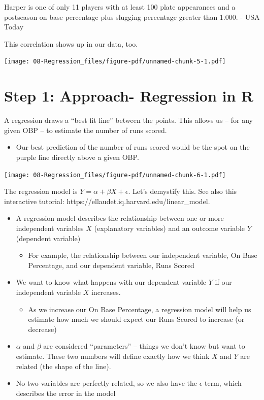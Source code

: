 \documentclass[
  letterpaper,
  DIV=11,
  numbers=noendperiod]{scrreprt}
\providecommand{\tightlist}{%
  \setlength{\itemsep}{0pt}\setlength{\parskip}{0pt}}\usepackage{longtable,booktabs,array}
\begin{document}
Harper is one of only 11 players with at least 100 plate appearances and
a postseason on base percentage plus slugging percentage greater than
1.000. - USA Today

This correlation shows up in our data, too.

\texttt{[image: 08-Regression\_files/figure-pdf/unnamed-chunk-5-1.pdf]}

\hypertarget{step-1-approach--regression-in-r}{%
\section{Step 1: Approach- Regression in
R}\label{step-1-approach--regression-in-r}}

A regression draws a ``best fit line'' between the points. This allows
us -- for any given OBP -- to estimate the number of runs scored.

\begin{itemize}
\tightlist
\item
  Our best prediction of the number of runs scored would be the spot on
  the purple line directly above a given OBP.
\end{itemize}

\texttt{[image: 08-Regression\_files/figure-pdf/unnamed-chunk-6-1.pdf]}

The regression model is \(Y = \alpha + \beta X + \epsilon\). Let's
demystify this. See also this interactive tutorial:
https://ellaudet.iq.harvard.edu/linear\_model.

\begin{itemize}
\tightlist
\item
  A regression model describes the relationship between one or more
  independent variables \(X\) (explanatory variables) and an outcome
  variable \(Y\) (dependent variable)

  \begin{itemize}
  \tightlist
  \item
    For example, the relationship between our independent variable, On
    Base Percentage, and our dependent variable, Runs Scored
  \end{itemize}
\item
  We want to know what happens with our dependent variable \(Y\) if our
  independent variable \(X\) increases.

  \begin{itemize}
  \tightlist
  \item
    As we increase our On Base Percentage, a regression model will help
    us estimate how much we should expect our Runs Scored to increase
    (or decrease)
  \end{itemize}
\item
  \(\alpha\) and \(\beta\) are considered ``parameters'' -- things we
  don't know but want to estimate. These two numbers will define exactly
  how we think \(X\) and \(Y\) are related (the shape of the line).
\item
  No two variables are perfectly related, so we also have the
  \(\epsilon\) term, which describes the error in the model
\end{itemize}
\end{document}
